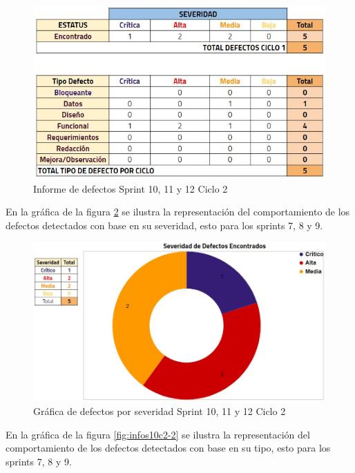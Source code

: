 \begin{figure}[H]
	\begin{center}
		\includegraphics[width=.95\textwidth]{images/pruebas/s10c2}
		\caption{Informe de defectos Sprint 10, 11 y 12  Ciclo 2}
		\label{fig:infos10c2}
	\end{center}
\end{figure}

En la gráfica de la figura \ref{fig:infos10c2-1} se ilustra la representación del comportamiento de los defectos detectados con base en su severidad, esto para los sprints 7, 8 y 9.

\begin{figure}[H]
	\begin{center}
		\includegraphics[width=.75\textwidth]{images/pruebas/s10c2-1}
		\caption{Gráfica de defectos por severidad Sprint 10, 11 y 12  Ciclo 2}
		\label{fig:infos10c2-1}
	\end{center}
\end{figure}

En la gráfica de la figura \ref{fig:infos10c2-2} se ilustra la representación del comportamiento de los defectos detectados con base en su tipo, esto para los sprints 7, 8 y 9.

